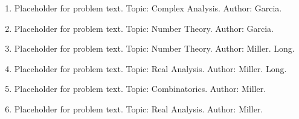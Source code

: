 \documentclass[12pt]{article}
\newcommand{\answer}[1]{} %
\newcommand{\topic}[1]{} %
\renewcommand{\author}[1]{} %
\newcommand{\isLong}[1]{} %
\begin{document}
\begin{enumerate}
\item Placeholder for problem text. Topic: Complex Analysis. Author: Garcia. 
\answer{Answer here}
\topic{Complex Analysis}
\author{Garcia}
\isLong{false}

\item Placeholder for problem text. Topic: Number Theory. Author: Garcia. 
\answer{Answer here}
\topic{Number Theory}
\author{Garcia}
\isLong{false}

\item Placeholder for problem text. Topic: Number Theory. Author: Miller. Long.
\answer{Answer here}
\topic{Number Theory}
\author{Miller}
\isLong{true}

\item Placeholder for problem text. Topic: Real Analysis. Author: Miller. Long.
\answer{Answer here}
\topic{Real Analysis}
\author{Miller}
\isLong{true}

\item Placeholder for problem text. Topic: Combinatorics. Author: Miller. 
\answer{Answer here}
\topic{Combinatorics}
\author{Miller}
\isLong{false}

\item Placeholder for problem text. Topic: Real Analysis. Author: Miller. 
\answer{Answer here}
\topic{Real Analysis}
\author{Miller}
\isLong{false}

\end{enumerate}
\end{document}
